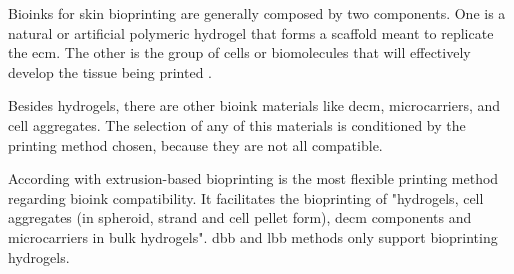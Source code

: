 Bioinks for skin bioprinting are generally composed by two components. One is a natural or artificial polymeric hydrogel that forms a scaffold meant to replicate the \gls{ecm}. The other is the group of cells or biomolecules that will effectively develop the tissue being printed \cite{Vijayavenkataraman2016_stateart_modelling_materials_processing, Yan2018_3dprinting_skin_tissue_preprocessing_final_eval, Tarassoli2018_skin_tissue_engineering_3dbioprinting_evolving_research_field}.

Besides hydrogels, there are other bioink materials like \gls{decm}, microcarriers, and cell aggregates. The selection of any of this materials is conditioned by the printing method chosen, because they are not all compatible.

According with \citeauthor{Hospodiuk2017_bioink_comprehensive_review_bioprintable_materials}\cite{Hospodiuk2017_bioink_comprehensive_review_bioprintable_materials} extrusion-based bioprinting is the most flexible printing method regarding bioink compatibility. It facilitates the bioprinting of "hydrogels, cell aggregates (in spheroid, strand and cell pellet form), \gls{decm} components and microcarriers in bulk hydrogels". \gls{dbb} and \gls{lbb} methods only support bioprinting hydrogels.

